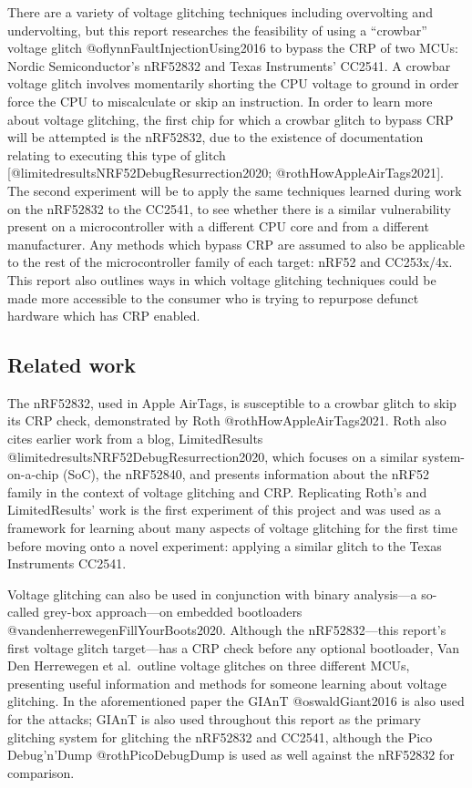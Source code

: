 There are a variety of voltage glitching techniques including
overvolting and undervolting, but this report researches the feasibility
of using a ``crowbar'' voltage glitch @oflynnFaultInjectionUsing2016 to
bypass the CRP of two MCUs: Nordic Semiconductor's nRF52832 and Texas
Instruments' CC2541. A crowbar voltage glitch involves momentarily
shorting the CPU voltage to ground in order force the CPU to
miscalculate or skip an instruction. In order to learn more about
voltage glitching, the first chip for which a crowbar glitch to bypass
CRP will be attempted is the nRF52832, due to the existence of
documentation relating to executing this type of glitch
{[}@limitedresultsNRF52DebugResurrection2020;
@rothHowAppleAirTags2021{]}. The second experiment will be to apply the
same techniques learned during work on the nRF52832 to the CC2541, to
see whether there is a similar vulnerability present on a
microcontroller with a different CPU core and from a different
manufacturer. Any methods which bypass CRP are assumed to also be
applicable to the rest of the microcontroller family of each target:
nRF52 and CC253x/4x. This report also outlines ways in which voltage
glitching techniques could be made more accessible to the consumer who
is trying to repurpose defunct hardware which has CRP enabled.

\hypertarget{related-work}{%
\subsection{Related work}\label{related-work}}

The nRF52832, used in Apple AirTags, is susceptible to a crowbar glitch
to skip its CRP check, demonstrated by Roth @rothHowAppleAirTags2021.
Roth also cites earlier work from a blog, LimitedResults
@limitedresultsNRF52DebugResurrection2020, which focuses on a similar
system-on-a-chip (SoC), the nRF52840, and presents information about the
nRF52 family in the context of voltage glitching and CRP. Replicating
Roth's and LimitedResults' work is the first experiment of this project
and was used as a framework for learning about many aspects of voltage
glitching for the first time before moving onto a novel experiment:
applying a similar glitch to the Texas Instruments CC2541.

Voltage glitching can also be used in conjunction with binary
analysis---a so-called grey-box approach---on embedded bootloaders
@vandenherrewegenFillYourBoots2020. Although the nRF52832---this
report's first voltage glitch target---has a CRP check before any
optional bootloader, Van Den Herrewegen et al.~outline voltage glitches
on three different MCUs, presenting useful information and methods for
someone learning about voltage glitching. In the aforementioned paper
the GIAnT @oswaldGiant2016 is also used for the attacks; GIAnT is also
used throughout this report as the primary glitching system for
glitching the nRF52832 and CC2541, although the Pico Debug'n'Dump
@rothPicoDebugDump is used as well against the nRF52832 for comparison.

